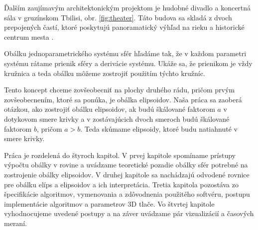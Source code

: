 Ďalším zaujímavým architektonickým projektom je hudobné divadlo a koncertná sála v gruzínskom Tbilisi, obr. \ref{fig:theater}. Táto budova sa skladá z dvoch prepojených častí, ktoré poskytujú panoramatický výhľad na rieku a historické centrum mesta \cite{Mesz18}.

Obálku jednoparametrického systému sfér hľadáme tak, že v každom parametri systému rátame prienik sféry a derivácie systému. Ukáže sa, že prienikom je vždy kružnica a teda obálku môžeme zostrojiť použitím týchto kružníc. 

Tento koncept chceme zovšeobecniť na plochy druhého rádu, pričom prvým zovšeobecnením, ktoré sa ponúka, je obálka elipsoidov. Naša práca sa zaoberá otázkou, ako zostrojiť obálku elipsoidov, ak budú škálované faktorom $a$ v dotykovom smere krivky a v zostávajúcich dvoch smeroch budú škálované faktorom $b$, pričom $a > b.$ Teda skúmame elipsoidy, ktoré budu natiahnuté v smere krivky.

Práca je rozdelená do štyroch kapitol. V prvej kapitole spomíname prístupy výpočtu obálky v rovine a uvádzame teoretické pozadie obálky sfér potrebné na zostrojenie obálky elipsoidov. V druhej kapitole sa nachádzajú odvodené rovnice pre obálku elíps a elipsoidov a ich interpretácia. Tretia kapitola pozostáva zo špecifikácie algoritmov, vymenovania a zdôvodnenia použitého softvéru, postupu implementácie algoritmov a parametrov 3D tlače. Vo štvrtej kapitole vyhodnocujeme uvedené postupy a na záver uvádzame pár vizualizácií a časových meraní.